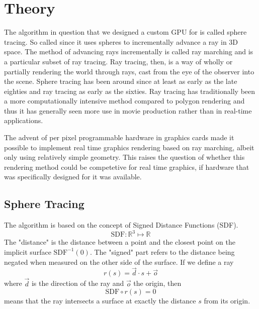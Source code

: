 \chapter{Theory}

	The algorithm in question that we designed a custom GPU for is called
	sphere tracing.\cite{Hart1996} So called since it uses spheres to
	incrementally advance a ray in 3D space. The method of advancing rays
	incrementally is called ray marching and is a particular subset of ray
	tracing.\cite{Whitted1980} Ray tracing, then, is a way of wholly or
	partially rendering the world through rays, cast from the eye of the
	observer into the scene.  Sphere tracing has been around since at least as
	early as the late eighties and ray tracing as early as the
	sixties.\cite{Hart1989,Appel1968} Ray tracing has traditionally been a more
	computationally intensive method compared to polygon
	rendering\cite{Wylie1967} and thus it has generally seen more use in movie
	production rather than in real-time applications.\cite{ref_needed?} 
	
	
	The advent of per pixel programmable hardware in graphics cards made it
	possible to implement real time graphics rendering based on ray marching, 
	albeit only using relatively simple geometry. This raises the question of 
	whether this rendering method could be competetive for real time graphics,
	if hardware that was specifically designed for it was available.
	
		
	\section{Sphere Tracing} 
	
		\begin{minipage}{0.6\textwidth} 
		
			The algorithm is based on the concept of Signed Distance Functions (SDF).
			$$\text{SDF}:\mathbb{R}^{3}\mapsto\mathbb{R}$$ 
			The "distance" is
			the distance between a point and the closest point on the implicit
			surface $\text{SDF}^{-1}(0)$. The "signed" part refers to the
			distance being negated when measured on the other side of the
			surface. If we define a ray $$r(s) = \vec{d} \cdot s + \vec{o}$$
			where $\vec{d}$ is the direction of the ray and $\vec{o}$ the origin,	then $$\text{SDF}\circ r(s) = 0$$ means that the ray
			intersects a surface at exactly the distance $s$ from its origin.
		
		\end{minipage} 
		
